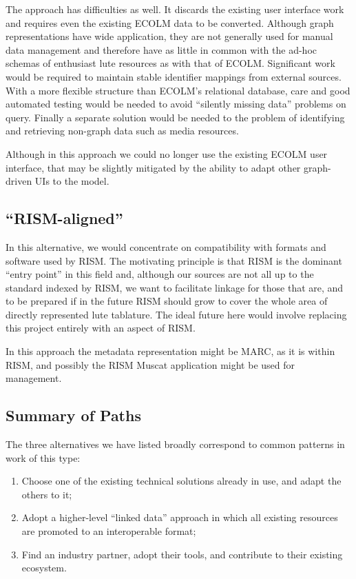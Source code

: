 \documentclass[sigconf, nonacm=true]{acmart}
\begin{document}
\begin{sloppypar}
  The approach has difficulties as well. It discards the existing user
  interface work and requires even the existing ECOLM data to be
  converted. Although graph representations have wide application,
  they are not generally used for manual data management and therefore
  have as little in common with the ad-hoc schemas of enthusiast lute
  resources as with that of ECOLM. Significant work would be required
  to maintain stable identifier mappings from external sources. With a
  more flexible structure than ECOLM's relational database, care and
  good automated testing would be needed to avoid ``silently missing
  data'' problems on query. Finally a separate solution would be
  needed to the problem of identifying and retrieving non-graph data
  such as media resources.

  Although in this approach we could no longer use the existing ECOLM
  user interface, that may be slightly mitigated by the ability to
  adapt other graph-driven UIs to the model.

  \subsection{``RISM-aligned''}

  In this alternative, we would concentrate on compatibility with
  formats and software used by RISM. The motivating principle is that
  RISM is the dominant ``entry point'' in this field and, although our
  sources are not all up to the standard indexed by RISM, we want to
  facilitate linkage for those that are, and to be prepared if in the
  future RISM should grow to cover the whole area of directly
  represented lute tablature. The ideal future here would involve
  replacing this project entirely with an aspect of RISM.

  In this approach the metadata representation might be MARC, as it is
  within RISM, and possibly the RISM Muscat application might be used
  for management.

  \subsection{Summary of Paths}

  The three alternatives we have listed broadly correspond to common
  patterns in work of this type:

  \begin{enumerate}
  \item Choose one of the existing technical solutions already in use,
    and adapt the others to it;
  \item Adopt a higher-level ``linked data'' approach in which all
    existing resources are promoted to an interoperable format;
  \item Find an industry partner, adopt their tools, and contribute to
    their existing ecosystem.
  \end{enumerate}


\end{sloppypar}
\end{document}
